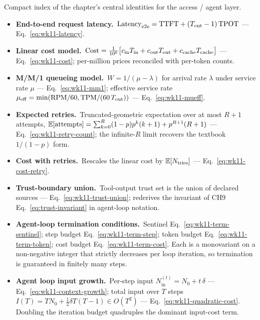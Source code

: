 \begin{derivledger}
Compact index of the chapter's central identities for the access /
agent layer.
\begin{itemize}
  \item \textbf{End-to-end request latency.}\
        $\mathrm{Latency}_{\rm e2e} = \mathrm{TTFT} + (T_{\rm out} - 1)\, \mathrm{TPOT}$
        --- Eq.~\eqref{eq:wk11-latency}.
  \item \textbf{Linear cost model.}\
        $\mathrm{Cost} = \tfrac{1}{10^{6}}\bigl[c_{\rm in} T_{\rm in} + c_{\rm out} T_{\rm out} + c_{\rm cache} T_{\rm cache}\bigr]$
        --- Eq.~\eqref{eq:wk11-cost}; per-million prices reconciled
        with per-token counts.
  \item \textbf{M/M/1 queueing model.}\
        $W = 1 / (\mu - \lambda)$ for arrival rate $\lambda$ under
        service rate $\mu$ --- Eq.~\eqref{eq:wk11-mm1};
        effective service rate
        $\mu_{\rm eff} = \min(\mathrm{RPM} / 60, \mathrm{TPM} / (60\, T_{\rm out}))$
        --- Eq.~\eqref{eq:wk11-mueff}.
  \item \textbf{Expected retries.}\
        Truncated-geometric expectation over at most $R+1$
        attempts, $\mathbb{E}[\text{attempts}] = \sum_{k=0}^{R}(1-p)p^k(k+1) + p^{R+1}(R+1)$
        --- Eq.~\eqref{eq:wk11-retry-count}; the infinite-$R$ limit
        recovers the textbook $1/(1-p)$ form.
  \item \textbf{Cost with retries.}\
        Rescales the linear cost by $\mathbb{E}[N_{\rm tries}]$
        --- Eq.~\eqref{eq:wk11-cost-retry}.
  \item \textbf{Trust-boundary union.}\
        Tool-output trust set is the union of declared sources
        --- Eq.~\eqref{eq:wk11-trust-union}; rederives the
        invariant of CH9 Eq.~\eqref{eq:trust-invariant}
        in agent-loop notation.
  \item \textbf{Agent-loop termination conditions.}\
        Sentinel Eq.~\eqref{eq:wk11-term-sentinel};
        step budget Eq.~\eqref{eq:wk11-term-step};
        token budget Eq.~\eqref{eq:wk11-term-token};
        cost budget Eq.~\eqref{eq:wk11-term-cost}. Each is a
        monovariant on a non-negative integer that strictly
        decreases per loop iteration, so termination is guaranteed
        in finitely many steps.
  \item \textbf{Agent loop input growth.}\
        Per-step input $N_\mathrm{in}^{(t)} = N_0 + t\,\delta$
        --- Eq.~\eqref{eq:wk11-context-growth}; total input over
        $T$ steps $I(T) = T N_0 + \tfrac{1}{2}\delta T(T-1) \in O(T^2)$
        --- Eq.~\eqref{eq:wk11-quadratic-cost}. Doubling the
        iteration budget quadruples the dominant input-cost term.
\end{itemize}
\end{derivledger}

